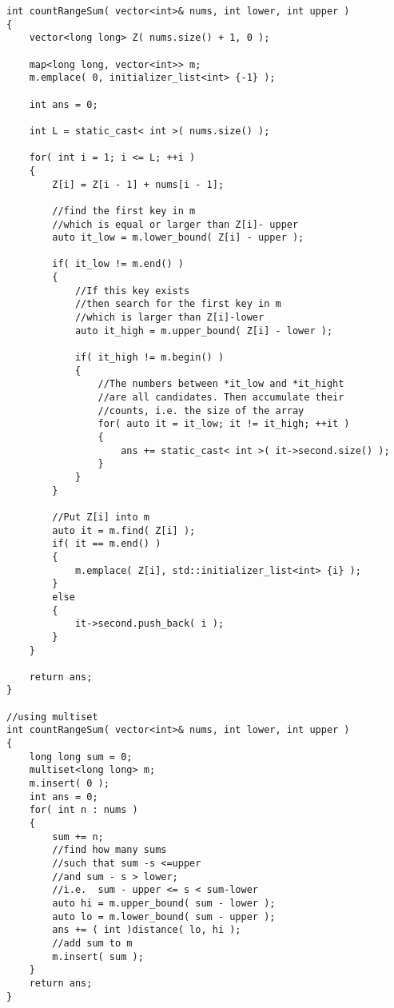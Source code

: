 \begin{lstlisting}[style=customc, caption={Tree Map And Binary Search}]
int countRangeSum( vector<int>& nums, int lower, int upper )
{
    vector<long long> Z( nums.size() + 1, 0 );

    map<long long, vector<int>> m;
    m.emplace( 0, initializer_list<int> {-1} );

    int ans = 0;

    int L = static_cast< int >( nums.size() );

    for( int i = 1; i <= L; ++i )
    {
        Z[i] = Z[i - 1] + nums[i - 1];

        //find the first key in m
        //which is equal or larger than Z[i]- upper
        auto it_low = m.lower_bound( Z[i] - upper );

        if( it_low != m.end() )
        {
            //If this key exists
            //then search for the first key in m
            //which is larger than Z[i]-lower
            auto it_high = m.upper_bound( Z[i] - lower );

            if( it_high != m.begin() )
            {
                //The numbers between *it_low and *it_hight
                //are all candidates. Then accumulate their
                //counts, i.e. the size of the array
                for( auto it = it_low; it != it_high; ++it )
                {
                    ans += static_cast< int >( it->second.size() );
                }
            }
        }

        //Put Z[i] into m
        auto it = m.find( Z[i] );
        if( it == m.end() )
        {
            m.emplace( Z[i], std::initializer_list<int> {i} );
        }
        else
        {
            it->second.push_back( i );
        }
    }

    return ans;
}

//using multiset
int countRangeSum( vector<int>& nums, int lower, int upper )
{
    long long sum = 0;
    multiset<long long> m;
    m.insert( 0 );
    int ans = 0;
    for( int n : nums )
    {
        sum += n;
        //find how many sums
        //such that sum -s <=upper
        //and sum - s > lower;
        //i.e.  sum - upper <= s < sum-lower
        auto hi = m.upper_bound( sum - lower );
        auto lo = m.lower_bound( sum - upper );
        ans += ( int )distance( lo, hi );
        //add sum to m
        m.insert( sum );
    }
    return ans;
}
\end{lstlisting}
